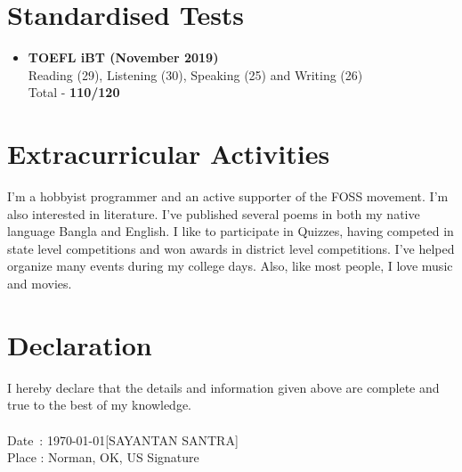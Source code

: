 \documentclass{article}
\begin{document}
\section*{Standardised Tests}
\begin{itemize}
	\item {\bf TOEFL iBT (November 2019)} \\
	      Reading (29), Listening (30), Speaking (25) and Writing (26) \\
	      Total - {\bf 110/120}
\end{itemize}

\section*{Extracurricular Activities}
I'm a hobbyist programmer and an active supporter of the FOSS movement. I'm also interested in literature. I've published several poems in both my native language Bangla and English. I like to participate in Quizzes, having competed in state level competitions and won awards in district level competitions. I've helped organize many events during my college days. Also, like most people, I love music and movies.

\section*{Declaration}
I hereby declare that the details and information given above are complete and true to the best of my knowledge. \\
\vspace{2cm} \\
Date \,: \today \hfill [SAYANTAN SANTRA] \\
Place  : Norman, OK, US \hfill Signature \hspace{1cm} \\
\end{document}
